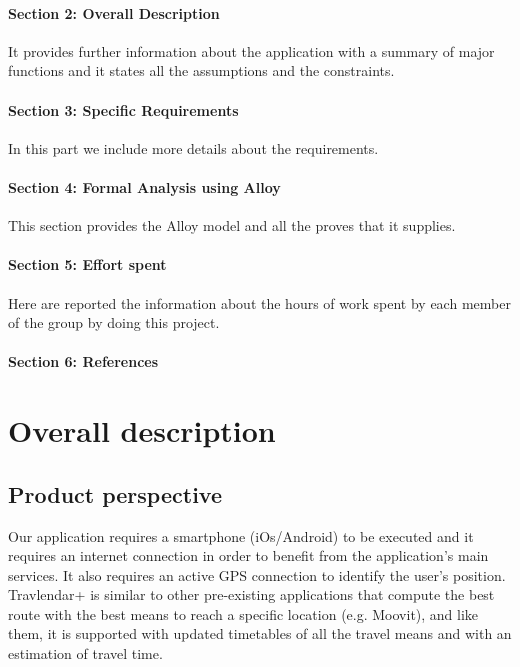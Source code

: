 \documentclass[12pt,titlepage]{article}
\begin{document}
\paragraph{Section 2: Overall Description}
It provides further information about the application with a summary of major functions and it states all the assumptions and the constraints.
\paragraph{Section 3: Specific Requirements}
In this part we include more details about the requirements.
\paragraph{Section 4: Formal Analysis using Alloy}
This section provides the Alloy model and all the proves that it supplies.
\paragraph{Section 5: Effort spent}
Here are reported the information about the hours of work spent by each member of the group by doing this project.
\paragraph{Section 6: References}
\pagebreak

\section{Overall description}\label{sec:crit}

\subsection{Product perspective}\label{sec:mod1}
Our application requires a smartphone (iOs/Android) to be executed and it requires an internet connection in order to benefit from the application's main services.
It also requires an active GPS connection to identify the user's position. 
Travlendar+ is similar to other pre-existing applications that compute the best route with the best means to reach a specific location (e.g. Moovit), and like them, it is supported with updated timetables of all the travel means and with an estimation of travel time. 
\end{document}
